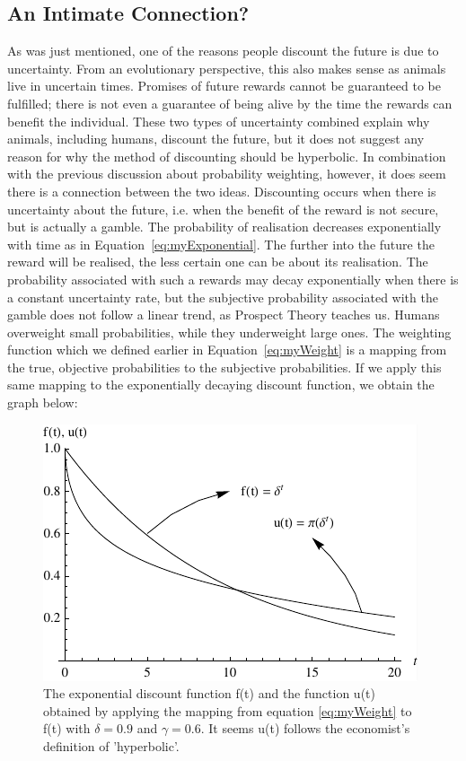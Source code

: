 \documentclass[a4paper,10pt]{article}
\numberwithin{equation}{section}
\begin{document}
\subsection{An Intimate Connection?}
\label{sec:An Intimate Connection?}

As was just mentioned, one of the reasons people discount the future is due to uncertainty. From an evolutionary perspective, this also makes sense as animals live in uncertain times. Promises of future rewards cannot be guaranteed to be fulfilled; there is not even a guarantee of being alive by the time the rewards can benefit the individual. These two types of uncertainty combined explain why animals, including humans, discount the future, but it does not suggest any reason for why the method of discounting should be hyperbolic. In combination with the previous discussion about probability weighting, however, it does seem there is a connection between the two ideas. Discounting occurs when there is uncertainty about the future, i.e. when the benefit of the reward is not secure, but is actually a gamble. The probability of realisation decreases exponentially with time as in Equation~\ref{eq:myExponential}. The further into the future the reward will be realised, the less certain one can be about its realisation. The probability associated with such a rewards may decay exponentially when there is a constant uncertainty rate, but the subjective probability associated with the gamble does not follow a linear trend, as Prospect Theory teaches us. Humans overweight small probabilities, while they underweight large ones. The weighting function which we defined earlier in Equation~\ref{eq:myWeight} is a mapping from the true, objective probabilities to the subjective probabilities. If we apply this same mapping to the exponentially decaying discount function, we obtain the graph below:

\begin{figure}[h]
\begin{center}
\leavevmode
\includegraphics[scale=1.2]{Graph13.pdf}
\captionsetup{width=240pt}
\caption{The exponential discount function f(t) and the function u(t) obtained by applying the mapping from equation \ref{eq:myWeight} to f(t) with $\delta=0.9$ and $\gamma=0.6$. It seems u(t) follows the economist's definition of 'hyperbolic'.}
\label{fig:Graph13.pdf}
\end{center}
\end{figure}
\end{document}
